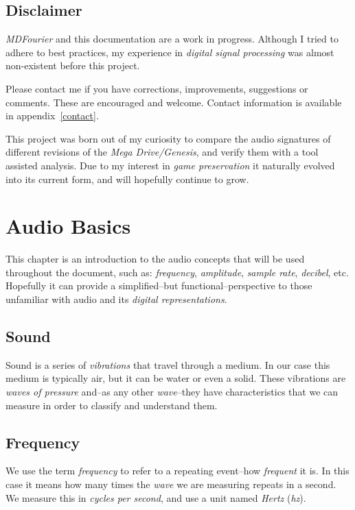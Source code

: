 \documentclass[10pt,a4paper]{report}
\newcommand{\ac}[1]{\textit{\mbox{\acrshort{#1}}}}
\begin{document}
\newpage
\section{Disclaimer}

\textit{MDFourier} and this documentation are a work in progress. Although I tried to adhere to best practices, my experience in \textit{digital signal processing} was almost non-existent before this project. 

Please contact me if you have corrections, improvements, suggestions or comments. These are encouraged and welcome. Contact information is available in appendix~\ref{contact}.

This project was born out of my curiosity to compare the audio signatures of different revisions of the \textit{Mega Drive/Genesis}, and verify them with a tool assisted analysis. Due to my interest in \textit{game preservation} it naturally evolved into its current form, and will hopefully continue to grow.

\chapter{Audio Basics}

This chapter is an introduction to the audio concepts that will be used throughout the document, such as: \textit{frequency}, \textit{amplitude}, \textit{sample rate}, \textit{decibel}, etc. Hopefully it can provide a simplified--but functional--perspective to those unfamiliar with audio and its \textit{digital representations}.

\section{Sound}

Sound is a series of \textit{vibrations} that travel through a medium. In our case this medium is typically air, but it can be water or even a solid. These vibrations are \textit{waves of pressure} and--as any other \textit{wave}--they have characteristics that we can measure in order to classify and understand them. 

\section{Frequency}

We use the term \textit{frequency} to refer to a repeating event--how \textit{frequent} it is. In this case it means how many times the \textit{wave} we are measuring repeats in a second. We measure this in \textit{cycles per second}, and use a unit named \textit{Hertz} (\ac{hz}). 
\end{document}
